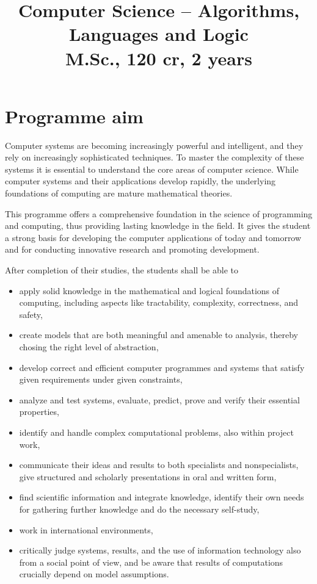 \documentclass[11pt]{article}
\begin{document}
\title{\bf Computer Science -- Algorithms, Languages and Logic\\
M.Sc., 120 cr, 2 years}
\author{}
\date{}
\maketitle

\section*{Programme aim}

Computer systems are becoming increasingly powerful and intelligent, and they rely on increasingly sophisticated techniques. To master the complexity of these systems it is essential to understand the core areas of computer science. While computer systems and their applications develop rapidly, the
underlying foundations of computing are mature mathematical theories.

This programme offers a comprehensive foundation in the science of 
programming and computing, thus providing lasting knowledge in the field. It 
gives the student a strong basis for developing the computer applications of today and tomorrow and for conducting innovative research and promoting development.

After completion of their studies, the students shall be able to

\begin{itemize}
\item apply solid knowledge in the mathematical and logical foundations of computing, including aspects like tractability, complexity, correctness, and 
safety, 
\item create models that are both meaningful and amenable to analysis, thereby 
chosing the right level of abstraction,
\item develop correct and efficient computer programmes and systems that 
satisfy given requirements under given constraints,
\item analyze and test systems, evaluate, predict, prove and verify their 
essential properties, 
\item identify and handle complex computational problems, also within project 
work,
\item communicate their ideas and results to both specialists and nonspecialists, give structured and scholarly presentations in oral and
written form,
\item find scientific information and integrate knowledge, identify their own 
needs for gathering further knowledge and do the necessary self-study,
\item work in international environments,
\item critically judge systems, results, and the use of information technology 
also from a social point of view, and be aware that results of computations 
crucially depend on model assumptions.
\end{itemize}
\end{document}
